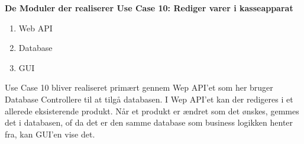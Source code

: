 \textbf{De Moduler der realiserer Use Case 10: Rediger varer i kasseapparat}

\begin{enumerate}
	\item Web API
	\item Database
	\item GUI
\end{enumerate}

Use Case 10 bliver realiseret primært gennem Wep API'et som her bruger Database Controllere til at tilgå databasen. I Wep API'et kan der redigeres i et allerede eksisterende produkt. Når et produkt er ændret som det ønskes, gemmes det i databasen, of da det er den samme database som business logikken henter fra, kan GUI'en vise det.